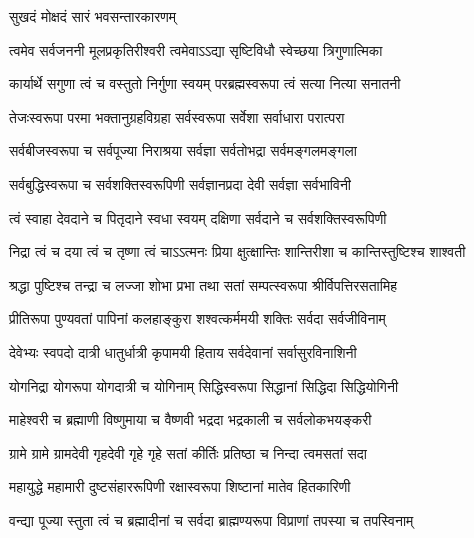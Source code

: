 

{सुखदं मोक्षदं सारं भवसन्तारकारणम्}

\twolineshloka
{त्वमेव सर्वजननी मूलप्रकृतिरीश्वरी}
{त्वमेवाऽऽद्या सृष्टिविधौ स्वेच्छया त्रिगुणात्मिका}

\twolineshloka
{कार्यार्थे सगुणा त्वं च वस्तुतो निर्गुणा स्वयम्}
{परब्रह्मस्वरूपा त्वं सत्या नित्या सनातनी}

\twolineshloka
{तेजःस्वरूपा परमा भक्तानुग्रहविग्रहा}
{सर्वस्वरूपा सर्वेशा सर्वाधारा परात्परा}

\twolineshloka
{सर्वबीजस्वरूपा च सर्वपूज्या निराश्रया}
{सर्वज्ञा सर्वतोभद्रा सर्वमङ्गलमङ्गला}

\twolineshloka
{सर्वबुद्धिस्वरूपा च सर्वशक्तिस्वरूपिणी}
{सर्वज्ञानप्रदा देवी सर्वज्ञा सर्वभाविनी}

\twolineshloka
{त्वं स्वाहा देवदाने च पितृदाने स्वधा स्वयम्}
{दक्षिणा सर्वदाने च सर्वशक्तिस्वरूपिणी}

\twolineshloka
{निद्रा त्वं च दया त्वं च तृष्णा त्वं चाऽऽत्मनः प्रिया}
{क्षुत्क्षान्तिः शान्तिरीशा च कान्तिस्तुष्टिश्च शाश्वती}

\twolineshloka
{श्रद्धा पुष्टिश्च तन्द्रा च लज्जा शोभा प्रभा तथा}
{सतां सम्पत्स्वरूपा श्रीर्विपत्तिरसतामिह}

\twolineshloka
{प्रीतिरूपा पुण्यवतां पापिनां कलहाङ्कुरा}
{शश्वत्कर्ममयी शक्तिः सर्वदा सर्वजीविनाम्}

\twolineshloka
{देवेभ्यः स्वपदो दात्री धातुर्धात्री कृपामयी}
{हिताय सर्वदेवानां सर्वासुरविनाशिनी}

\twolineshloka
{योगनिद्रा योगरूपा योगदात्री च योगिनाम्}
{सिद्धिस्वरूपा सिद्धानां सिद्धिदा सिद्धियोगिनी}

\twolineshloka
{माहेश्वरी च ब्रह्माणी विष्णुमाया च वैष्णवी}
{भद्रदा भद्रकाली च सर्वलोकभयङ्करी}

\twolineshloka
{ग्रामे ग्रामे ग्रामदेवी गृहदेवी गृहे गृहे}
{सतां कीर्तिः प्रतिष्ठा च निन्दा त्वमसतां सदा}

\twolineshloka
{महायुद्धे महामारी दुष्टसंहाररूपिणी}
{रक्षास्वरूपा शिष्टानां मातेव हितकारिणी}

\twolineshloka
{वन्द्या पूज्या स्तुता त्वं च ब्रह्मादीनां च सर्वदा}
{ब्राह्मण्यरूपा विप्राणां तपस्या च तपस्विनाम्}

